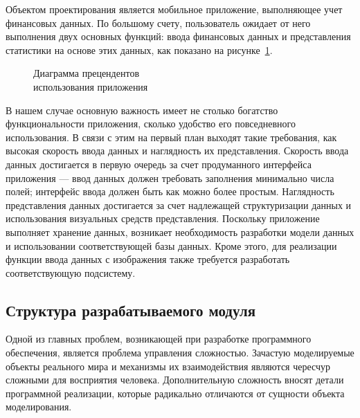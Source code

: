 Объектом проектирования является мобильное приложение,
выполняющее учет финансовых данных. По большому счету, пользователь
ожидает от него выполнения двух основных функций:
ввода финансовых данных и представления статистики на основе этих данных,
как показано на рисунке~\ref{fig:design_use_cases}.

\begin{figure}[h!]
  \centering
  \caption{Диаграмма прецендентов \\ использования приложения}
  \label{fig:design_use_cases}
\end{figure}

В нашем случае основную важность имеет не столько богатство
функциональности приложения, сколько удобство его повседневного использования.
В связи с этим на первый план выходят такие требования, как
высокая скорость ввода данных и наглядность их представления.
Скорость ввода данных достигается в первую очередь за счет
продуманного интерфейса приложения ---
ввод данных должен требовать заполнения минимально числа полей;
интерфейс ввода должен быть как можно более простым.
Наглядность представления данных достигается за счет надлежащей
структуризации данных и использования визуальных средств представления.
Поскольку приложение выполняет хранение данных, возникает необходимость
разработки модели данных и использовании соответствующей базы данных.
Кроме этого, для реализации функции ввода данных с изображения
также требуется разработать соответствующую подсистему.

\subsection{Структура разрабатываемого модуля}
\label{subsec:design_structure}

Одной из главных проблем, возникающей при разработке программного обеспечения,
является проблема управления сложностью. Зачастую моделируемые объекты реального
мира и механизмы их взаимодействия являются чересчур сложными для восприятия человека.
Дополнительную сложность вносят детали программной
реализации, которые радикально отличаются от сущности объекта моделирования.

